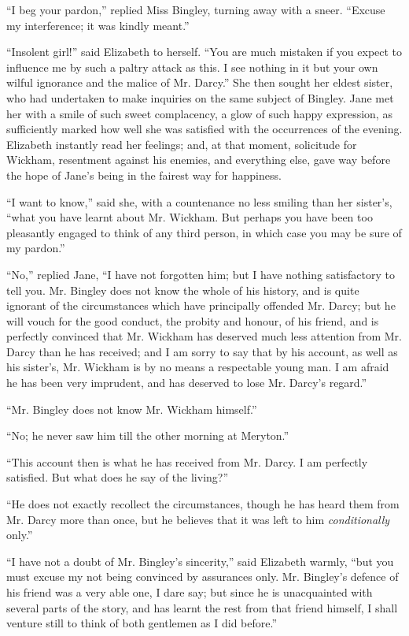 \documentclass[12pt,openright]{book}
\begin{document}
“I beg your pardon,” replied Miss Bingley, turning away with a sneer. “Excuse my interference; it was kindly meant.”

“Insolent girl!” said Elizabeth to herself. “You are much mistaken if you expect to influence me by such a paltry attack as this. I see nothing in it but your own wilful ignorance and the malice of Mr. Darcy.” She then sought her eldest sister, who had undertaken to make inquiries on the same subject of Bingley. Jane met her with a smile of such sweet complacency, a glow of such happy expression, as sufficiently marked how well she was satisfied with the occurrences of the evening. Elizabeth instantly read her feelings; and, at that moment, solicitude for Wickham, resentment against his enemies, and everything else, gave way before the hope of Jane’s being in the fairest way for happiness.

“I want to know,” said she, with a countenance no less smiling than her sister’s, “what you have learnt about Mr. Wickham. But perhaps you have been too pleasantly engaged to think of any third person, in which case you may be sure of my pardon.”

“No,” replied Jane, “I have not forgotten him; but I have nothing satisfactory to tell you. Mr. Bingley does not know the whole of his history, and is quite ignorant of the circumstances which have principally offended Mr. Darcy; but he will vouch for the good conduct, the probity and honour, of his friend, and is perfectly convinced that Mr. Wickham has deserved much less attention from Mr. Darcy than he has received; and I am sorry to say that by his account, as well as his sister’s, Mr. Wickham is by no means a respectable young man. I am afraid he has been very imprudent, and has deserved to lose Mr. Darcy’s regard.”

“Mr. Bingley does not know Mr. Wickham himself.”

“No; he never saw him till the other morning at Meryton.”

“This account then is what he has received from Mr. Darcy. I am perfectly satisfied. But what does he say of the living?”

“He does not exactly recollect the circumstances, though he has heard them from Mr. Darcy more than once, but he believes that it was left to him \textit{conditionally} only.”

“I have not a doubt of Mr. Bingley’s sincerity,” said Elizabeth warmly, “but you must excuse my not being convinced by assurances only. Mr. Bingley’s defence of his friend was a very able one, I dare say; but since he is unacquainted with several parts of the story, and has learnt the rest from that friend himself, I shall venture still to think of both gentlemen as I did before.”
\end{document}
